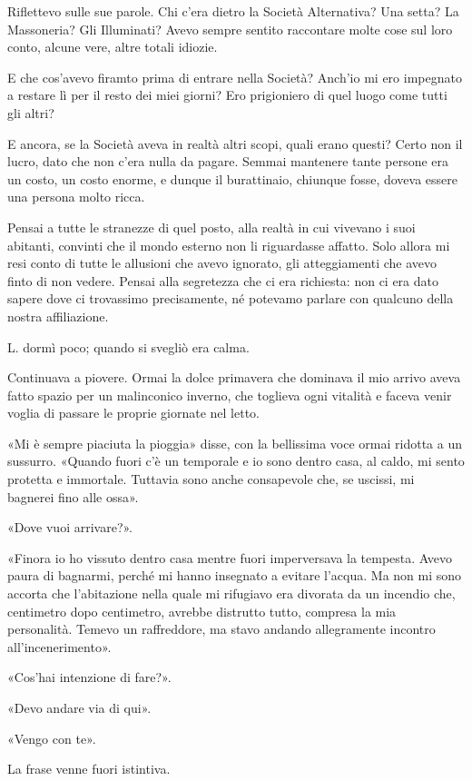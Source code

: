 \documentclass[a4paper,12pt]{book}
\begin{document}
Riflettevo sulle sue parole. Chi c'era dietro la Società Alternativa? Una setta?
La Massoneria? Gli Illuminati? Avevo sempre sentito raccontare molte cose sul
loro conto, alcune vere, altre totali idiozie.

E che cos'avevo firamto prima di entrare nella Società? Anch'io mi ero impegnato
a restare lì per il resto dei miei giorni? Ero prigioniero di quel luogo come
tutti gli altri?

E ancora, se la Società aveva in realtà altri scopi, quali erano questi? Certo
non il lucro, dato che non c'era nulla da pagare. Semmai mantenere tante persone
era un costo, un costo enorme, e dunque il burattinaio, chiunque fosse, doveva
essere una persona molto ricca.

Pensai a tutte le stranezze di quel posto, alla realtà in cui vivevano i suoi
abitanti, convinti che il mondo esterno non li riguardasse affatto. Solo allora
mi resi conto di tutte le allusioni che avevo ignorato, gli atteggiamenti che
avevo finto di non vedere. Pensai alla segretezza che ci era richiesta: non ci
era dato sapere dove ci trovassimo precisamente, né potevamo parlare con
qualcuno della nostra affiliazione.

L. dormì poco; quando si svegliò era calma.

Continuava a piovere. Ormai la dolce primavera che dominava il mio arrivo aveva
fatto spazio per un malinconico inverno, che toglieva ogni vitalità e faceva
venir voglia di passare le proprie giornate nel letto.

«Mi è sempre piaciuta la pioggia» disse, con la bellissima voce ormai ridotta
a un sussurro. «Quando fuori c'è un temporale e io sono dentro casa, al caldo,
mi sento protetta e immortale. Tuttavia sono anche consapevole che, se uscissi,
mi bagnerei fino alle ossa».

«Dove vuoi arrivare?».

«Finora io ho vissuto dentro casa mentre fuori imperversava la tempesta. Avevo
paura di bagnarmi, perché mi hanno insegnato a evitare l'acqua. Ma non mi sono
accorta che l'abitazione nella quale mi rifugiavo era divorata da un incendio
che, centimetro dopo centimetro, avrebbe distrutto tutto, compresa la mia
personalità. Temevo un raffreddore, ma stavo andando allegramente incontro
all'incenerimento».

«Cos'hai intenzione di fare?».

«Devo andare via di qui».

«Vengo con te».

La frase venne fuori istintiva.
\end{document}
